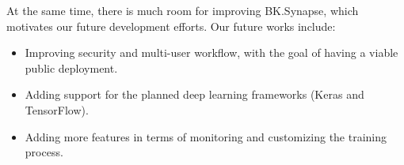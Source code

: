 \documentclass[a4paper, 13pt, oneside]{report}
\begin{document}
At the same time, there is much room for improving BK.Synapse, which motivates our future development efforts. Our future works include:
\begin{itemize}
    \item Improving security and multi-user workflow, with the goal of having a viable public deployment.
    \item Adding support for the planned deep learning frameworks (Keras and TensorFlow).
    \item Adding more features in terms of monitoring and customizing the training process.
\end{itemize}

\pagebreak



\end{document}
